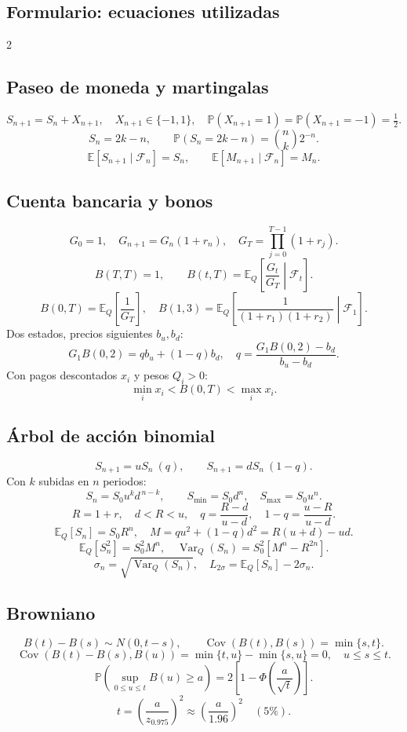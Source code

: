 \documentclass[11pt, a4paper]{article}
\begin{document}
\newpage
\begin{landscape}
\section*{Formulario: ecuaciones utilizadas}
\scriptsize
\setlength{\columnsep}{1cm}
\setlength{\abovedisplayskip}{3pt}
\setlength{\belowdisplayskip}{3pt}
\begin{multicols}{2}

\subsection*{Paseo de moneda y martingalas}
\[
S_{n+1}=S_n+X_{n+1},\quad X_{n+1}\in\{-1,1\},\quad
\mathbb{P}(X_{n+1}=1)=\mathbb{P}(X_{n+1}=-1)=\tfrac12.
\]
\[
S_n=2k-n,\qquad
\mathbb{P}(S_n=2k-n)=\binom{n}{k}2^{-n}.
\]
\[
\mathbb{E}[S_{n+1}\mid\mathcal{F}_n]=S_n,\qquad
\mathbb{E}[M_{n+1}\mid\mathcal{F}_n]=M_n.
\]

\subsection*{Cuenta bancaria y bonos}
\[
G_0=1,\quad G_{n+1}=G_n(1+r_n),\quad
G_T=\prod_{j=0}^{T-1}(1+r_j).
\]
\[
B(T,T)=1,\qquad
B(t,T)=\mathbb{E}_{Q}\left[\frac{G_t}{G_T}\middle|\mathcal{F}_t\right].
\]
\[
B(0,T)=\mathbb{E}_{Q}\left[\frac{1}{G_T}\right],\quad
B(1,3)=\mathbb{E}_{Q}\left[\frac{1}{(1+r_1)(1+r_2)}\middle|\mathcal{F}_1\right].
\]
Dos estados, precios siguientes \(b_u,b_d\):
\[
G_1B(0,2)=qb_u+(1-q)b_d,\quad
q=\frac{G_1B(0,2)-b_d}{b_u-b_d}.
\]
Con pagos descontados \(x_i\) y pesos \(Q_i>0\):
\[
\min_i x_i<B(0,T)<\max_i x_i.
\]

\subsection*{Árbol de acción binomial}
\[
S_{n+1}=uS_n\ (q),\qquad S_{n+1}=dS_n\ (1-q).
\]
Con \(k\) subidas en \(n\) periodos:
\[
S_n=S_0u^kd^{\,n-k},\qquad
S_{\min}=S_0d^n,\quad S_{\max}=S_0u^n.
\]
\[
R=1+r,\quad d<R<u,\quad
q=\frac{R-d}{u-d},\quad 1-q=\frac{u-R}{u-d}.
\]
\[
\mathbb{E}_{Q}[S_n]=S_0R^n,\quad
M=qu^2+(1-q)d^2=R(u+d)-ud.
\]
\[
\mathbb{E}_{Q}[S_n^2]=S_0^2M^n,\quad
\operatorname{Var}_{Q}(S_n)=S_0^2[M^n-R^{2n}].
\]
\[
\sigma_n=\sqrt{\operatorname{Var}_{Q}(S_n)},\quad
L_{2\sigma}=\mathbb{E}_{Q}[S_n]-2\sigma_n.
\]

\subsection*{Browniano}
\[
B(t)-B(s)\sim N(0,t-s),\qquad
\operatorname{Cov}(B(t),B(s))=\min\{s,t\}.
\]
\[
\operatorname{Cov}(B(t)-B(s),B(u))
=\min\{t,u\}-\min\{s,u\}=0,\quad u\le s\le t.
\]
\[
\mathbb{P}\left(\sup_{0\le u\le t}B(u)\ge a\right)
=2\left[1-\Phi\left(\frac{a}{\sqrt t}\right)\right].
\]
\[
t=\left(\frac{a}{z_{0.975}}\right)^2
\approx\left(\frac{a}{1.96}\right)^2\quad (5\%).
\]


\end{multicols}
\end{landscape}
\end{document}
